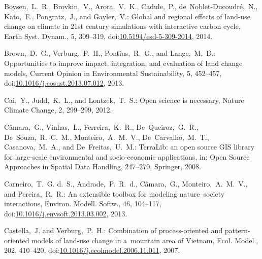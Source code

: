 \documentclass[gmdd, online, hvmath]{copernicus}
\begin{document}
\begin{thebibliography}{97}
  Boysen,~L.~R., Brovkin,~V., Arora,~V.~K., Cadule,~P.,
  de~Noblet-Ducoudr\'{e},~N., Kato,~E., Pongratz,~J., and Gayler,~V.:
  Global and regional effects of land-use change on climate in 21st
  century simulations with interactive carbon cycle, Earth
  Syst. Dynam., 5, 309--319,
doi:\href{http://dx.doi.org/10.5194/esd-5-309-2014}{10.5194/esd-5-309-2014},
  2014. %



 Brown,~D.~G., Verburg,~P.~H., Pontius,~R.~G.,
  and Lange,~M.~D.: Opportunities to improve impact, integration, and
  evaluation of land change models, Current Opinion in Environmental
  Sustainability, 5,
  452--457,
doi:\href{http://dx.doi.org/10.1016/j.cosust.2013.07.012}{10.1016/j.cosust.2013.07.012}, 2013.


 Cai,~Y.,
  Judd,~K.~L., and Lontzek,~T.~S.: Open science is necessary, Nature
  Climate Change, 2,
  299--299, 2012.


 C{\^a}mara,~G., Vinhas,~L.,
  Ferreira,~K.~R., De~Queiroz,~G.~R., De~Souza,~R.~C.~M.,
  Monteiro,~A.~M.~V., De~Carvalho,~M.~T., Casanova,~M.~A., and
  De~Freitas,~U.~M.: TerraLib: an open source GIS library for
  large-scale environmental and socio-economic applications, in: Open
  Source Approaches in Spatial Data Handling, 247--270, Springer,
  2008.


 Carneiro,~T.~G. d.~S.,
  Andrade,~P.~R.~d., C\^{a}mara,~G., Monteiro,~A.~M.~V., and
  Pereira,~R.~R.: An extensible toolbox for modeling nature--society
  interactions, Environ. Modell. Softw., 46, 104--117,
  doi:\href{http://dx.doi.org/10.1016/j.envsoft.2013.03.002}{10.1016/j.envsoft.2013.03.002}, 2013.


 Castella,~J. and
  Verburg,~P.~H.: Combination of process-oriented and pattern-oriented
  models of land-use change in a~mountain area of Vietnam,
  Ecol. Model., 202, 410--420,
doi:\href{http://dx.doi.org/10.1016/j.ecolmodel.2006.11.011}{10.1016/j.ecolmodel.2006.11.011},
  2007. %



\end{thebibliography}
\end{document}
